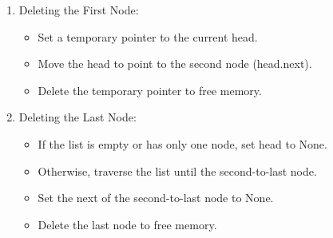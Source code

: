 \begin{enumerate}
\def\labelenumi{\arabic{enumi}.}
\tightlist
\item
  Deleting the First Node:

  \begin{itemize}
  \tightlist
  \item
    Set a temporary pointer to the current head.
  \item
    Move the head to point to the second node (head.next).
  \item
    Delete the temporary pointer to free memory.
  \end{itemize}

\begin{Shaded}
\begin{Highlighting}[]
\NormalTok{):}
     
\OperatorTok{=} 
        \OperatorTok{=} 
\end{Highlighting}
\end{Shaded}
\item
  Deleting the Last Node:

  \begin{itemize}
  \tightlist
  \item
    If the list is empty or has only one node, set head to None.
  \item
    Otherwise, traverse the list until the second-to-last node.
  \item
    Set the next of the second-to-last node to None.
  \item
    Delete the last node to free memory.
  \end{itemize}

\begin{Shaded}
\begin{Highlighting}[]
\NormalTok{):}
      
      \NormalTok{:}
         
        \OperatorTok{=} 
\OperatorTok{=} 
    \NormalTok{:}
\OperatorTok{=}
 \OperatorTok{=} 
\end{Highlighting}
\end{Shaded}
\end{enumerate}

